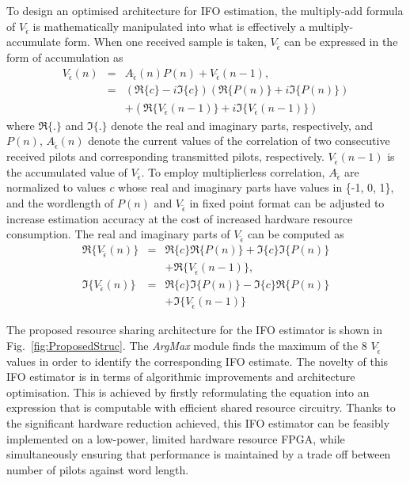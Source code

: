 To design an optimised architecture for IFO estimation, the multiply-add formula of $V_{\tilde{\epsilon}}$ is mathematically manipulated into what is effectively a multiply-accumulate form.
When one received sample is taken, $V_{\tilde{\epsilon}}$ can be expressed in the form of accumulation as
\begin{eqnarray}
\label{complexVi}
V_{\tilde{\epsilon}}(n)	&=&   A_{\tilde{\epsilon}}(n) P(n)  + V_{\tilde{\epsilon}}(n-1), \nonumber \\
						&=& (\Re{\{c\}} - i \Im{\{c\}})  (\Re{\{P(n)\}} + i \Im{\{P(n)\}}) \nonumber \\
	 					&  &+ (\Re{\{V_{\tilde{\epsilon}}(n-1)\}}+i \Im{\{V_{\tilde{\epsilon}}(n-1)\}})
\end{eqnarray}
where $\Re{\{.\}}$ and $\Im{\{.\}}$ denote the real and imaginary parts, respectively, and $P(n)$, $A_{\tilde{\epsilon}}(n)$ denote the current values of the correlation of two consecutive received pilots and corresponding transmitted pilots, respectively.
$V_{\tilde{\epsilon}}(n-1)$ is the accumulated value of $V_{\tilde{\epsilon}}$.
To employ multiplierless correlation, $A_{\tilde{\epsilon}}$ are normalized to values $c$ whose real and imaginary parts have values in \{-1, 0, 1\}, and the wordlength of $P(n)$ and $V_{\tilde{\epsilon}}$ in fixed point format can be adjusted to increase estimation accuracy at the cost of increased hardware resource consumption.
The real and imaginary parts of $V_{\tilde{\epsilon}}$ can be computed as
\begin{eqnarray}
\label{realimaginaryVi}
\Re{\{V_{\tilde{\epsilon}}(n)\}} &=& \Re{\{c\}} \Re{\{ P(n)\}}+\Im{\{c\}} \Im{\{ P(n)\}} \nonumber \\
								& &+ \Re{\{V_{\tilde{\epsilon}}(n-1)\}} , 					\nonumber \\
\Im{\{V_{\tilde{\epsilon}}(n)\}} &=& \Re{\{c\}} \Im{\{ P(n)\}}-\Im{\{c\}} \Re{\{ P(n)\}}	\nonumber \\
								& &+ \Im{\{V_{\tilde{\epsilon}}(n-1)\}}
\end{eqnarray}

The proposed resource sharing architecture for the IFO estimator is shown in Fig.~\ref{fig:ProposedStruc}. The \emph{ArgMax} module finds the maximum of the 8 $V_{\tilde{\epsilon}}$ values in order to identify the corresponding IFO estimate.
The novelty of this IFO estimator is in terms of algorithmic improvements and architecture optimisation. This is achieved by firstly reformulating the equation into an expression that is computable with efficient shared resource circuitry.
Thanks to the significant hardware reduction achieved, this IFO estimator can be feasibly implemented on a low-power, limited hardware resource FPGA, while simultaneously ensuring that performance is maintained by a trade off between number of pilots against word length.

